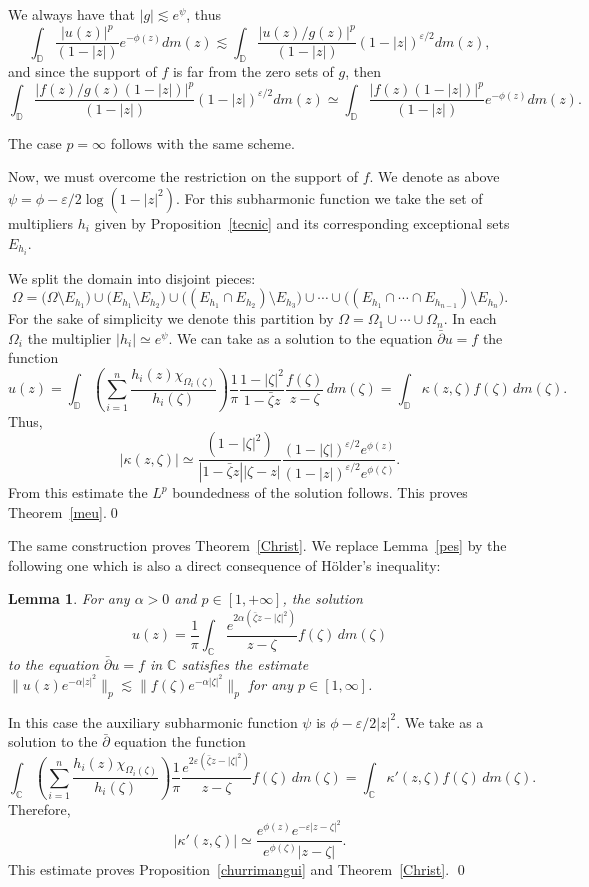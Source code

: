 \documentclass[12pt,twoside,final,psamsfonts]{amsart}
\theoremstyle{plain}
\newtheorem{lema}{Lemma}
\theoremstyle{remark}
\theoremstyle{definition}
\newcommand{\C}{{\mathbb C}}
\newcommand{\D}{{\mathbb D}}
\newcommand{\dbar}{\bar\partial}
\begin{document}
We always have that $|g|\lesssim e^{\psi}$, thus
\[
\int_\D \frac{|u(z)|^p}{(1-|z|)}e^{-\phi(z)} dm(z)\lesssim
\int_\D \frac{|u(z)/g(z)|^p}{(1-|z|)}(1-|z|)^{\varepsilon/2} dm(z),
\]
and since the support of $f$ is far from the zero sets of $g$, then
\[
\int_\D \frac{|f(z)/g(z)(1-|z|)|^p}{(1-|z|)}(1-|z|)^{\varepsilon/2} dm(z)
\simeq
\int_\D \frac{|f(z)(1-|z|)|^p}{(1-|z|)}e^{-\phi(z)} dm(z).
\]

The case $p=\infty$ follows with the same scheme.

Now, we must overcome the restriction on the support of $f$. 
We denote as above $\psi=\phi-\varepsilon/2 \log (1-|z|^2)$. For this
subharmonic function we take the set of
multipliers $h_i$ given by Proposition~\ref{tecnic} and its corresponding
exceptional sets $E_{h_i}$.

We split the domain into disjoint pieces: 
\[
\Omega=\bigl(\Omega\setminus E_{h_1}\bigr)\cup 
\bigl(E_{h_1}\setminus E_{h_2}\bigr)\cup
\bigl((E_{h_1}\cap E_{h_2})\setminus E_{h_3}\bigr)\cup\cdots\cup 
\bigl((E_{h_1}\cap\cdots\cap E_{h_{n-1}})\setminus E_{h_n}\bigr).
\] 
For the sake of simplicity we denote this partition 
 by $\Omega=\Omega_1\cup\cdots\cup\Omega_n$. In each $\Omega_i$ the
multiplier $|h_i|\simeq e^{\psi}$. We can take as a solution to the equation
$\dbar u=f$ the function
\[
u(z)=\int_\D \left( \sum_{i=1}^n \frac{h_i(z)\chi_{\Omega_i(\zeta)}}{h_i(\zeta)}
\right)\frac 1\pi\frac{1-|\zeta|^2}{1-\bar\zeta
z}\frac{f(\zeta)}{z-\zeta}\, dm(\zeta)=\int_\D \kappa(z,\zeta)f(\zeta)
\, dm(\zeta).
\]
Thus, 
\[
|\kappa(z,\zeta)|\simeq \frac{(1-|\zeta|^2)}{|1-\bar\zeta
z||\zeta-z|}\frac{(1-|\zeta|)^{\varepsilon/2}e^{\phi(z)}}
{(1-|z|)^{\varepsilon/2}e^{\phi(\zeta)}}.
\]
From this estimate the $L^p$ boundedness of the solution follows. This proves
Theorem~\ref{meu}.\qed

The same construction proves Theorem~\ref{Christ}. We  replace 
Lemma~\ref{pes} by the following one which is also a direct consequence of
H\"older's inequality:

\begin{lema}
For any $\alpha>0$ and $p\in[1,+\infty]$, the solution
\[
u(z)=\frac 1\pi \int_{\C}\frac{e^{2\alpha(\bar\zeta z -|\zeta|^2)}}{z-\zeta}
f(\zeta)\, dm(\zeta)
\]
to the equation $\dbar u=f$ in $\C$ satisfies the estimate 
$\|u(z)e^{-\alpha|z|^2}\|_p\lesssim \|f(\zeta)e^{-\alpha|\zeta|^2}\|_p$ for any
$p\in [1,\infty]$. 
\end{lema}

In this case the auxiliary subharmonic function $\psi$ is  $\phi-\varepsilon/2
|z|^2$. We take as a solution to the $\bar\partial$ equation the function
\[
\int_\C \left( \sum_{i=1}^n
\frac{h_i(z)\chi_{\Omega_i(\zeta)}}{h_i(\zeta)}\right)
 \frac 1\pi \frac{e^{2\varepsilon(\bar\zeta z -|\zeta|^2)}}{z-\zeta}
f(\zeta)\,dm(\zeta)=\int_\C \kappa'(z,\zeta)f(\zeta)\, dm(\zeta).
\]
Therefore,
\[
|\kappa'(z,\zeta)|\simeq  \frac{e^{\phi(z)}e^{-\varepsilon|z-\zeta|^2}}
{e^{\phi(\zeta)}|z-\zeta|}.
\]
This estimate proves Proposition~\ref{churrimangui} and Theorem~\ref{Christ}.
\qed
\end{document}
